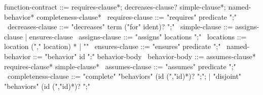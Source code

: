 \begin{syntax}
  function-contract ::= requires-clause*;
                        decreases-clause? simple-clause*;
                        named-behavior* completeness-clause*
  \
  requires-clause ::= "requires" predicate ";"
  \
  decreases-clause ::= "decreases" term ("for" ident)? ";"
  \
  simple-clause ::= assigns-clause | ensures-clause
  \
  assigns-clause ::= "assigns" locations ";"
  \
  locations ::= location ("," location) * | "\nothing"
  \
  ensures-clause ::= "ensures" predicate ";"
  \
  named-behavior ::= "behavior" id ":" behavior-body
  \
  behavior-body ::= assumes-clause* requires-clause* simple-clause*
  \
  assumes-clause ::= "assumes" predicate ";"
  \
  completeness-clause ::= "complete" "behaviors" (id (","id)*)? ";";
     | "disjoint" "behaviors" (id (","id)*)? ";"
\end{syntax}
